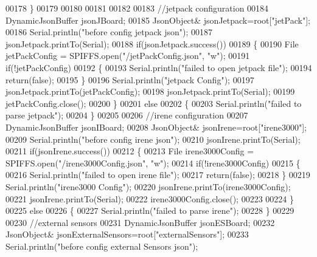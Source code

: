 \begin{DoxyCode}
00178     \}
00179         
00180 
00181     
00182 
00183     \textcolor{comment}{//jetpack configuration}
00184     DynamicJsonBuffer jsonJBoard;
00185         JsonObject& jsonJetpack=root[\textcolor{stringliteral}{"jetPack"}];
00186     Serial.println(\textcolor{stringliteral}{"before config jetpack json"});
00187     jsonJetpack.printTo(Serial);
00188     \textcolor{keywordflow}{if}(jsonJetpack.success())
00189     \{   
00190         File jetPackConfig = SPIFFS.open(\textcolor{stringliteral}{"/jetPackConfig.json"}, \textcolor{stringliteral}{"w"});   
00191         \textcolor{keywordflow}{if}(!jetPackConfig)
00192         \{
00193             Serial.println(\textcolor{stringliteral}{"failed to open jetpack file"});
00194             \textcolor{keywordflow}{return}(\textcolor{keyword}{false});
00195         \}
00196         Serial.println(\textcolor{stringliteral}{"jetpack Config"});   
00197         jsonJetpack.printTo(jetPackConfig);
00198         jsonJetpack.printTo(Serial);
00199         jetPackConfig.close();
00200     \}
00201     \textcolor{keywordflow}{else}
00202     \{
00203         Serial.println(\textcolor{stringliteral}{"failed to parse jetpack"});  
00204     \}
00205     
00206     \textcolor{comment}{//irene configuration   }
00207     DynamicJsonBuffer jsonIBoard;
00208         JsonObject& jsonIrene=root[\textcolor{stringliteral}{"irene3000"}];
00209     Serial.println(\textcolor{stringliteral}{"before config irene json"}); 
00210     jsonIrene.printTo(Serial);
00211     \textcolor{keywordflow}{if}(jsonIrene.success())
00212     \{
00213         File irene3000Config = SPIFFS.open(\textcolor{stringliteral}{"/irene3000Config.json"}, \textcolor{stringliteral}{"w"});   
00214         \textcolor{keywordflow}{if}(!irene3000Config)
00215         \{
00216             Serial.println(\textcolor{stringliteral}{"failed to open irene file"});
00217             \textcolor{keywordflow}{return}(\textcolor{keyword}{false});
00218         \}
00219         Serial.println(\textcolor{stringliteral}{"irene3000 Config"});
00220         jsonIrene.printTo(irene3000Config);
00221         jsonIrene.printTo(Serial);
00222         irene3000Config.close();
00223     
00224     \}
00225     \textcolor{keywordflow}{else}
00226     \{
00227         Serial.println(\textcolor{stringliteral}{"failed to parse irene"});    
00228     \}
00229     
00230     \textcolor{comment}{//external sensors}
00231     DynamicJsonBuffer jsonESBoard;
00232         JsonObject& jsonExternalSensors=root[\textcolor{stringliteral}{"externalSensors"}];
00233     Serial.println(\textcolor{stringliteral}{"before config external Sensors json"});

\end{DoxyCode}
